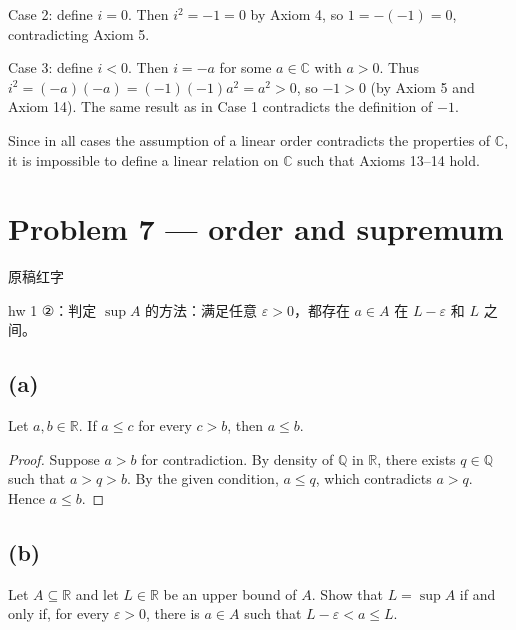 Case 2: define \(i = 0\). Then \(i^{2} = - 1 = 0\) by Axiom 4, so \(1 = - \left( {- 1} \right) = 0\), contradicting Axiom 5.

Case 3: define \(i < 0\). Then \(i = - a\) for some \(a \in \mathbb{C}\) with \(a > 0\). Thus \(i^{2} = \left( {- a} \right)\left( {- a} \right) = \left( {- 1} \right)\left( {- 1} \right)a^{2} = a^{2} > 0\), so \(- 1 > 0\) (by Axiom 5 and Axiom 14). The same result as in Case 1 contradicts the definition of \(- 1\).

Since in all cases the assumption of a linear order contradicts the properties of \(\mathbb{C}\), it is impossible to define a linear relation on \(\mathbb{C}\) such that Axioms 13--14 hold.

\section{Problem 7 --- order and supremum}

\begin{qlnote}{原稿红字}

hw 1 ②：判定 \(\sup A\) 的方法：满足任意 \(\varepsilon > 0\)，都存在 \(a \in A\) 在 \(L - \varepsilon\) 和 \(L\) 之间。

\end{qlnote}

\subsection{(a)}

Let \(a,b \in \mathbb{R}\). If \(a \leq c\) for every \(c > b\), then \(a \leq b\).

\begin{proof}

Suppose \(a > b\) for contradiction. By density of \(\mathbb{Q}\) in \(\mathbb{R}\), there exists \(q \in \mathbb{Q}\) such that \(a > q > b\). By the given condition, \(a \leq q\), which contradicts \(a > q\). Hence \(a \leq b\).

\end{proof}

\subsection{(b)}

Let \(A \subseteq \mathbb{R}\) and let \(L \in \mathbb{R}\) be an upper bound of \(A\). Show that \(L = \sup A\) if and only if, for every \(\varepsilon > 0\), there is \(a \in A\) such that \(L - \varepsilon < a \leq L\).

